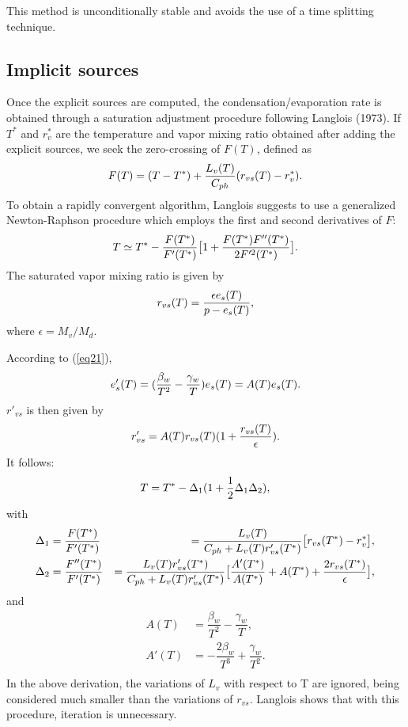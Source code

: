 This method is unconditionally stable and avoids the use of a time splitting technique.


\subsection{Implicit sources}
Once the explicit sources are computed, the condensation/evaporation rate is
obtained through a saturation adjustment procedure following Langlois (1973).
If $T^*$ and $r_v^*$ are the temperature and vapor mixing ratio obtained after
adding the explicit sources, we seek the zero-crossing of $F(T)$, defined as
\begin{equation}
F(T)= (T-T^*) + {L_v(T) \over C_{ph}} (r_{vs}(T)-r_v^*).
\end{equation}
To obtain a rapidly convergent algorithm, Langlois suggests to use a
generalized
Newton-Raphson procedure which employs the first and second derivatives of $F$:
\begin{equation}
T \simeq T^*- {F(T^*) \over F'(T^*)} \big[ 1+ {F(T^*)F''(T^*) \over 2 F'^2(T^*)}\big].
\end{equation}
The saturated vapor mixing ratio is given by
\begin{equation}
r_{vs}(T)= {\epsilon e_s(T) \over p-e_s(T)},
\end{equation}
where $\epsilon = M_v/M_d$.

According to (\ref{eq21}),
\begin{equation}
e_s'(T)= ( {\beta_w \over T^2} - {\gamma_w \over T}) e_s(T) = A(T) e_s(T).
\end{equation}
$r'_{vs}$ is then given by
\begin{equation}
r'_{vs} = A(T) r_{vs}(T)(1 + {r_{vs}(T) \over \epsilon}).
\end{equation}
It follows:
\begin{equation}
T= T^* - \Delta_1 (1 +{1\over 2} \Delta_1 \Delta_2),
\end{equation}
with
\begin{eqnarray}
\Delta_1&= \dfrac {F(T^*)}{ F'(T^*)}&= {L_v(T) \over C_{ph} + L_v(T)r'_{vs}(T^*)}
         \big[r_{vs}(T^*)-r_v^*\big], \\
\Delta_2&= \dfrac {F''(T^*)}{F'(T^*)}&= {L_v(T) r'_{vs}(T^*) \over C_{ph} + L_v(T) r'_{vs}(T^*)}
         \big[ {A'(T^*) \over A(T^*)} + A(T^*) +
{2 r_{vs}(T^*) \over \epsilon}\big] ,
\end{eqnarray}
and
\begin{eqnarray}
A(T)&=\dfrac{\beta_w}{T^2} - \dfrac{\gamma_w}{T}, \\
A'(T)&=-\dfrac{2\beta_w}{T^3} + \dfrac{\gamma_w}{T^2}. \\
\end{eqnarray}
In the above derivation, the variations of $L_v$ with respect to T are ignored,
being considered much smaller than the variations of $r_{vs}$. Langlois shows
that with this procedure, iteration is unnecessary.

